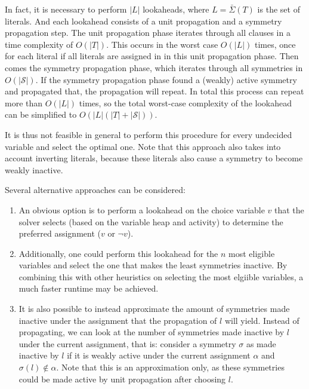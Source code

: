 	In fact, it is necessary to perform $|L|$ lookaheads, where $L = \bar{\Sigma}(T)$ is the set of literals.
	And each lookahead consists of a unit propagation and a symmetry propagation step.
	The unit propagation phase iterates through all clauses in a time complexity of $O(|T|)$.
	This occurs in the worst case $O(|L|)$ times,
	once for each literal if all literals are assigned in in this unit propagation phase.
	Then comes the symmetry propagation phase, which iterates through all symmetries in $O(|\mathcal{S}|)$.
	If the symmetry propagation phase found a (weakly) active symmetry and propagated that,
	the propagation will repeat.
	In total this process can repeat more than $O(|L|)$ times,
	so the total worst-case complexity of the lookahead can be simplified to $O(|L|(|T| + |\mathcal{S}|))$.
	

	It is thus not feasible in general to perform this procedure for every undecided variable and
	select the optimal one.
	Note that this approach also takes into account inverting literals,
	because these literals also cause a symmetry to become weakly inactive.
	
	Several alternative approaches can be considered:

	\begin{enumerate}
		\item An obvious option is to perform a lookahead on the choice variable $v$ that the solver
			selects (based on the variable heap and activity) to determine the
			preferred assignment ($v$ or $\neg v$).

		\item Additionally, one could perform this lookahead for the $n$ most eligible variables
			and select the one that makes the least symmetries inactive.
			By combining this with other heuristics on selecting the most elgiible variables,
			a much faster runtime may be achieved.

		\item It is also possible to instead approximate the amount of symmetries made inactive under the
			assignment that the propagation of $l$ will yield.
			Instead of propagating, we can look at the number of symmetries made inactive by $l$
			under the current assignment, that is: consider a symmetry $\sigma$ as
			made inactive by $l$ if it is weakly active under the current assignment $\alpha$ and
			$\sigma(l) \notin \alpha$.
			Note that this is an approximation only, as these symmetries could be made active by
			unit propagation after choosing $l$.
	\end{enumerate}

